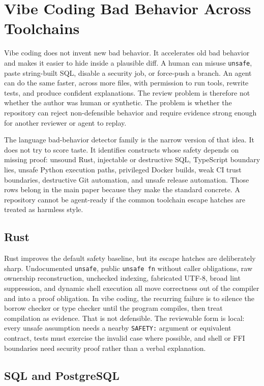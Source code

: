 \section{Vibe Coding Bad Behavior Across Toolchains}

Vibe coding does not invent new bad behavior. It accelerates old bad behavior and makes it easier to hide inside a plausible diff. A human can misuse \texttt{unsafe}, paste string-built SQL, disable a security job, or force-push a branch. An agent can do the same faster, across more files, with permission to run tools, rewrite tests, and produce confident explanations. The review problem is therefore not whether the author was human or synthetic. The problem is whether the repository can reject non-defensible behavior and require evidence strong enough for another reviewer or agent to replay.

The language bad-behavior detector family is the narrow version of that idea. It does not try to score taste. It identifies constructs whose safety depends on missing proof: unsound Rust, injectable or destructive SQL, TypeScript boundary lies, unsafe Python execution paths, privileged Docker builds, weak CI trust boundaries, destructive Git automation, and unsafe release automation. Those rows belong in the main paper because they make the standard concrete. A repository cannot be agent-ready if the common toolchain escape hatches are treated as harmless style.

\subsection{Rust}

Rust improves the default safety baseline, but its escape hatches are deliberately sharp. Undocumented \texttt{unsafe}, public \texttt{unsafe fn} without caller obligations, raw ownership reconstruction, unchecked indexing, fabricated UTF-8, broad lint suppression, and dynamic shell execution all move correctness out of the compiler and into a proof obligation. In vibe coding, the recurring failure is to silence the borrow checker or type checker until the program compiles, then treat compilation as evidence. That is not defensible. The reviewable form is local: every unsafe assumption needs a nearby \texttt{SAFETY:} argument or equivalent contract, tests must exercise the invalid case where possible, and shell or FFI boundaries need security proof rather than a verbal explanation.

\subsection{SQL and PostgreSQL}

